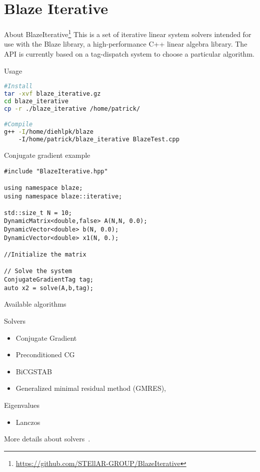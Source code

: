 \documentclass[\classoption]{beamer}
\begin{document}
\section{Blaze Iterative}


\begin{frame}[fragile]{About BlazeIterative\footnote{\tiny\url{https://github.com/STEllAR-GROUP/BlazeIterative}}}
This is a set of iterative linear system solvers intended for use with the Blaze library, a high-performance C++ linear algebra library. The API is currently based on a tag-dispatch system to choose a particular algorithm.

\begin{block}{Usage}
\begin{lstlisting}[language=bash]
#Install
tar -xvf blaze_iterative.gz
cd blaze_iterative
cp -r ./blaze_iterative /home/patrick/

#Compile
g++ -I/home/diehlpk/blaze 
    -I/home/patrick/blaze_iterative BlazeTest.cpp
\end{lstlisting}
\end{block}


\end{frame}

\begin{frame}[fragile]{Conjugate gradient example}
\begin{lstlisting}
#include "BlazeIterative.hpp"

using namespace blaze;
using namespace blaze::iterative;

std::size_t N = 10;
DynamicMatrix<double,false> A(N,N, 0.0);
DynamicVector<double> b(N, 0.0);
DynamicVector<double> x1(N, 0.);

//Initialize the matrix

// Solve the system
ConjugateGradientTag tag;
auto x2 = solve(A,b,tag);

\end{lstlisting}

\end{frame}

\begin{frame}{Available algorithms}

\begin{block}{Solvers}
\begin{itemize}
\item Conjugate Gradient
\item Preconditioned CG
\item BiCGSTAB
\item Generalized minimal residual method (GMRES),
\end{itemize}
\end{block}


\begin{block}{Eigenvalues}
\begin{itemize}
\item Lanczos
\end{itemize}
\end{block}
More details about solvers~\cite{barrett1994templates}.
\end{frame}
\end{document}
